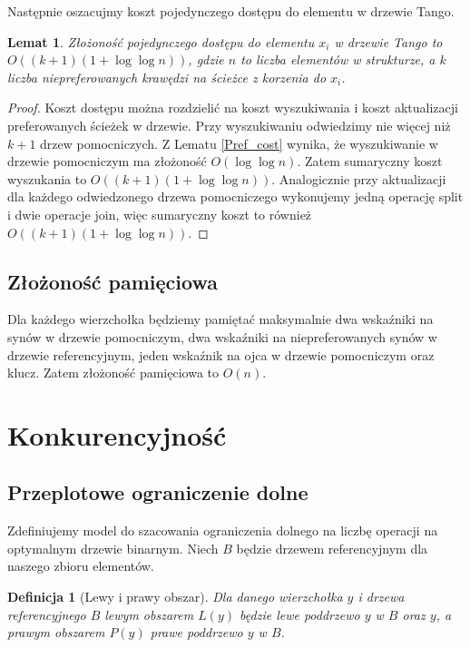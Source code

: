 \documentclass[declaration,shortabstract]{iithesis}
\newcounter{thm}[section]
\theoremstyle{thm}
\newtheorem{definition}[thm]{Definicja}
\theoremstyle{remark}
\theoremstyle{plain}
\newtheorem{theorem}[thm]{Twierdzenie}
\theoremstyle{plain}
\theoremstyle{plain}
\newtheorem{lemma}[thm]{Lemat}
\begin{document}
Następnie oszacujmy koszt pojedynczego dostępu do elementu w drzewie Tango.
\begin{lemma} 
\label{Tango_cost} Złożoność pojedynczego dostępu do elementu \(x_i\) w drzewie Tango to \(O((k+1)(1+\log \log n))\), gdzie $n$ to liczba elementów w strukturze, a $k$ liczba niepreferowanych krawędzi na ścieżce z korzenia do \(x_i\). 
\end{lemma} 
\begin{proof} Koszt dostępu można rozdzielić na koszt wyszukiwania i koszt aktualizacji preferowanych ścieżek w drzewie. Przy wyszukiwaniu odwiedzimy nie więcej niż $k+1$ drzew pomocniczych. Z Lematu \ref{Pref_cost} wynika, że wyszukiwanie w drzewie pomocniczym ma złożoność \(O(\log \log n)\). Zatem sumaryczny koszt wyszukania to \(O((k+1)(1+\log \log n))\). Analogicznie przy aktualizacji dla każdego odwiedzonego drzewa pomocniczego wykonujemy jedną operację split i dwie operacje join, więc sumaryczny koszt to również \(O((k+1)(1+\log \log n))\). 
\end{proof} 

\subsection{Złożoność pamięciowa} Dla każdego wierzchołka będziemy pamiętać maksymalnie dwa wskaźniki na synów w drzewie pomocniczym, dwa wskaźniki na niepreferowanych synów w drzewie referencyjnym, jeden wskaźnik na ojca w drzewie pomocniczym oraz klucz. Zatem złożoność pamięciowa to \( O (n)\). 

\section{Konkurencyjność}   

\subsection{Przeplotowe ograniczenie dolne} 
Zdefiniujemy model do szacowania ograniczenia dolnego na liczbę operacji na optymalnym drzewie binarnym. Niech \(B\) będzie drzewem referencyjnym dla naszego zbioru elementów. 

\begin{definition}[Lewy i prawy obszar] 
Dla danego wierzchołka \(y\) i drzewa referencyjnego \(B\) lewym obszarem \(L(y)\) będzie lewe poddrzewo \(y\) w $B$ oraz \(y\), a prawym obszarem \(P(y)\) prawe poddrzewo \(y\) w $B$.
\end{definition}  
\end{document}

